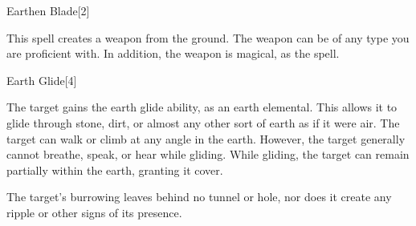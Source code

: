 \begin{spellsection}{Earthen Blade}[2]
    \begin{spellheader}
    \end{spellheader}
    \begin{spellcontent}
        \begin{spelltargetinginfo}
        \end{spelltargetinginfo}
        \begin{spelleffects}
            \spelleffect This spell creates a weapon from the ground. The weapon can be of any type you are proficient with. In addition, the weapon is magical, as the  spell.
            \spelldur \durlong \dismissable
        \end{spelleffects}
    \end{spellcontent}
    \begin{spellfooter}
        \miscastexplode
    \end{spellfooter}
\end{spellsection}

\begin{spellsection}{Earth Glide}[4]
    \begin{spellheader}
    \end{spellheader}
    \begin{spellcontent}
        \begin{spelltargetinginfo}
        \end{spelltargetinginfo}
        \begin{spelleffects}
            \spelleffect The target gains the earth glide ability, as an earth elemental. This allows it to glide through stone, dirt, or almost any other sort of earth as if it were air. The target can walk or climb at any angle in the earth. However, the target generally cannot breathe, speak, or hear while gliding. While gliding, the target can remain partially within the earth, granting it cover.
            \spelldur \durshort
        \end{spelleffects}
    \end{spellcontent}
    \begin{spellfooter}
        \spellnotes The target's burrowing leaves behind no tunnel or hole, nor does it create any ripple or other signs of its presence.
        \miscastexplode
    \end{spellfooter}
\end{spellsection}

